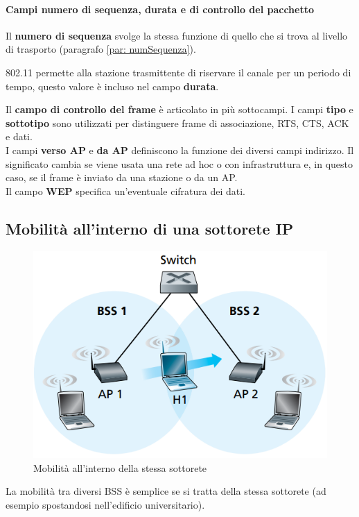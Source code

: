 \documentclass[11pt,a4paper]{book}
\begin{document}
\paragraph{Campi numero di sequenza, durata e di controllo del pacchetto}
Il \textbf{numero di sequenza} svolge la stessa funzione di quello che si trova al livello di trasporto (paragrafo \ref{par: numSequenza}).

802.11 permette alla stazione trasmittente di riservare il canale per un periodo di tempo, questo valore è incluso nel campo \textbf{durata}.

Il \textbf{campo di controllo del frame} è articolato in più sottocampi. I campi \textbf{tipo} e \textbf{sottotipo} sono utilizzati per distinguere frame di associazione, RTS, CTS, ACK e dati. \\
I campi \textbf{verso AP} e \textbf{da AP} definiscono la funzione dei diversi campi indirizzo. Il significato cambia se viene usata una rete ad hoc o con infrastruttura e, in questo caso, se il frame è inviato da una stazione o da un AP. \\
Il campo \textbf{WEP} specifica un'eventuale cifratura dei dati.

\subsection{Mobilità all'interno di una sottorete IP}
\begin{figure}
		\includegraphics[scale=0.6]{img/103.png}
		\caption{Mobilità all'interno della stessa sottorete}
		\label{fig: 103}
\end{figure}
La mobilità tra diversi BSS è semplice se si tratta della stessa sottorete (ad esempio spostandosi nell'edificio universitario).
\end{document}

